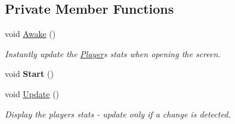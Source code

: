 \subsection*{Private Member Functions}
\begin{DoxyCompactItemize}
\item 
\mbox{\label{class_profile_aa17a7ceae100a98b5962b238758a72b0}} 
void \mbox{\hyperlink{class_profile_aa17a7ceae100a98b5962b238758a72b0}{Awake}} ()
\begin{DoxyCompactList}\small\item\em Instantly update the \mbox{\hyperlink{class_player}{Player}}\textquotesingle{}s stats when opening the screen. \end{DoxyCompactList}\item 
\mbox{\label{class_profile_a647e62f8ea4ea155450b61f840196144}} 
void {\bfseries Start} ()
\item 
\mbox{\label{class_profile_a2764f91d58e74837f15fcea7b04635b7}} 
void \mbox{\hyperlink{class_profile_a2764f91d58e74837f15fcea7b04635b7}{Update}} ()
\begin{DoxyCompactList}\small\item\em Display the player\textquotesingle{}s stats -\/ update only if a change is detected. \end{DoxyCompactList}\end{DoxyCompactItemize}
